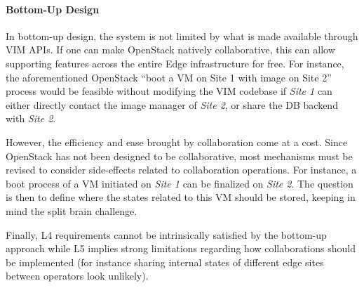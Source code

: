 

\paragraph{Bottom-Up Design}
In bottom-up design, the system is not limited by what is made
available through VIM APIs. If one can make OpenStack natively
collaborative, this can allow supporting features across the entire
Edge infrastructure for free. For instance, the aforementioned
OpenStack ``boot a VM on Site 1 with image on Site 2'' process would
be feasible without modifying the VIM codebase if \emph{Site 1} can
either directly contact the image manager of \emph{Site 2}, or share
the DB backend with \emph{Site 2}.

However, the efficiency and ease brought by collaboration come at a
cost. Since OpenStack has not been designed to be collaborative, most
mechanisms must be revised to consider side-effects related to
collaboration operations.
%
For instance, a boot process of a VM initiated on \emph{Site 1} can 
be finalized
on \emph{Site 2}. The question is then to define where the states
related to this VM should be stored, keeping in mind the split brain
challenge.

Finally, L4 requirements cannot be intrinsically satisfied by the
bottom-up approach while L5 implies strong limitations regarding how
collaborations should be implemented (for instance sharing internal
states of different edge sites between operators look unlikely).

%



